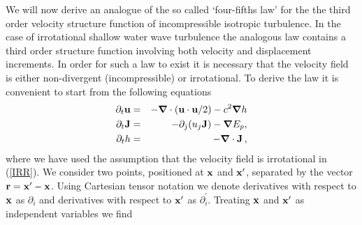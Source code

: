 We will now derive an analogue of the so called `four-fifths law'
\cite[]{Kolmogorov1941} for the the third order velocity structure function of
incompressible isotropic turbulence. In the case of irrotational shallow water
wave turbulence the analogous law contains a third order structure function
involving both velocity and displacement increments. In order for such a law to
exist it is necessary that the velocity field is either non-divergent
(incompressible) or irrotational. To derive the law it is convenient to start
from the following equations
\begin{eqnarray} \label{IRR}
\partial_t \textbf{u} &=& -\boldsymbol{\nabla} \cdot (\textbf{u} \cdot \textbf{u} /2) - c^2 \boldsymbol{\nabla} h  \\
\partial_t \textbf{J} &=& -\partial_j (u_j \textbf{J}) - \boldsymbol{\nabla} E_p,\\
\partial_t h   &=& -\boldsymbol{\nabla} \cdot \textbf{J} \, ,
\end{eqnarray}
where we have used the assumption that the velocity field is irrotational in
(\ref{IRR}). We consider two points, positioned at $ \bf x $ and $ {\bf
x}^\prime $, separated by the vector $ {\bf r} = {\bf x}^\prime - {\bf x} $.
Using Cartesian tensor notation we denote derivatives with respect to $ {\bf x} $
as $ \partial_i $ and derivatives with respect to $ {\bf x}^\prime $ as $
\partial^{\prime}_i $. Treating $ \bf x $ and $ {\bf x}^\prime $ as independent
variables we find

